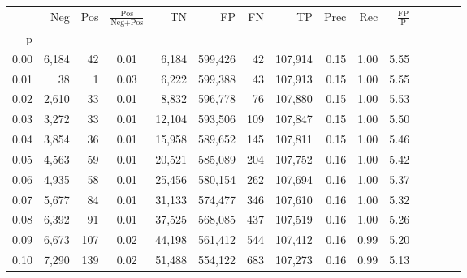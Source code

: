 \begin{tabular}{rrrcrrrrrrrrrrr}
\toprule
{} &     Neg &    Pos & $\frac{\text{Pos}}{\text{Neg}+\text{Pos}}$ &       TN &       FP &       FN &       TP &  Prec &   Rec & $\frac{\text{FP}}{\text{P}}$ \\
p    &         &        &                                            &          &          &          &          &       &       &                              \\
\midrule
0.00 &   6,184 &     42 &                                       0.01 &    6,184 &  599,426 &       42 &  107,914 &  0.15 &  1.00 &                         5.55 \\
0.01 &      38 &      1 &                                       0.03 &    6,222 &  599,388 &       43 &  107,913 &  0.15 &  1.00 &                         5.55 \\
0.02 &   2,610 &     33 &                                       0.01 &    8,832 &  596,778 &       76 &  107,880 &  0.15 &  1.00 &                         5.53 \\
0.03 &   3,272 &     33 &                                       0.01 &   12,104 &  593,506 &      109 &  107,847 &  0.15 &  1.00 &                         5.50 \\
0.04 &   3,854 &     36 &                                       0.01 &   15,958 &  589,652 &      145 &  107,811 &  0.15 &  1.00 &                         5.46 \\
0.05 &   4,563 &     59 &                                       0.01 &   20,521 &  585,089 &      204 &  107,752 &  0.16 &  1.00 &                         5.42 \\
0.06 &   4,935 &     58 &                                       0.01 &   25,456 &  580,154 &      262 &  107,694 &  0.16 &  1.00 &                         5.37 \\
0.07 &   5,677 &     84 &                                       0.01 &   31,133 &  574,477 &      346 &  107,610 &  0.16 &  1.00 &                         5.32 \\
0.08 &   6,392 &     91 &                                       0.01 &   37,525 &  568,085 &      437 &  107,519 &  0.16 &  1.00 &                         5.26 \\
0.09 &   6,673 &    107 &                                       0.02 &   44,198 &  561,412 &      544 &  107,412 &  0.16 &  0.99 &                         5.20 \\
0.10 &   7,290 &    139 &                                       0.02 &   51,488 &  554,122 &      683 &  107,273 &  0.16 &  0.99 &                         5.13 \\

\end{tabular}
